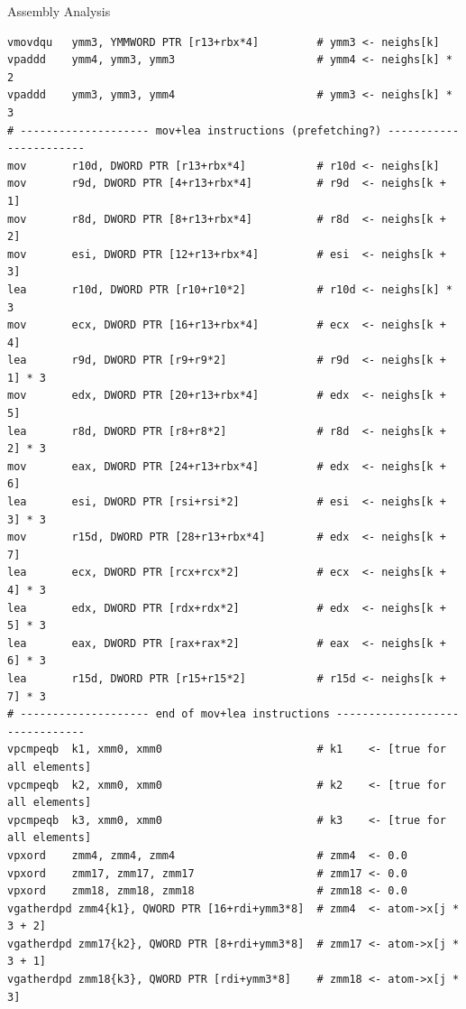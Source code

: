 \documentclass[aspectratio=169,t]{beamer}
\begin{document}
  \begin{frame}[fragile]{Assembly Analysis}
    \vspace{-17.5pt}
    \begin{lstlisting}[language={[x64]Assembler},basicstyle=\tt\tiny]
vmovdqu   ymm3, YMMWORD PTR [r13+rbx*4]         # ymm3 <- neighs[k]
vpaddd    ymm4, ymm3, ymm3                      # ymm4 <- neighs[k] * 2
vpaddd    ymm3, ymm3, ymm4                      # ymm3 <- neighs[k] * 3
# -------------------- mov+lea instructions (prefetching?) -----------------------
mov       r10d, DWORD PTR [r13+rbx*4]           # r10d <- neighs[k]
mov       r9d, DWORD PTR [4+r13+rbx*4]          # r9d  <- neighs[k + 1]
mov       r8d, DWORD PTR [8+r13+rbx*4]          # r8d  <- neighs[k + 2]
mov       esi, DWORD PTR [12+r13+rbx*4]         # esi  <- neighs[k + 3]
lea       r10d, DWORD PTR [r10+r10*2]           # r10d <- neighs[k] * 3
mov       ecx, DWORD PTR [16+r13+rbx*4]         # ecx  <- neighs[k + 4]
lea       r9d, DWORD PTR [r9+r9*2]              # r9d  <- neighs[k + 1] * 3
mov       edx, DWORD PTR [20+r13+rbx*4]         # edx  <- neighs[k + 5]
lea       r8d, DWORD PTR [r8+r8*2]              # r8d  <- neighs[k + 2] * 3
mov       eax, DWORD PTR [24+r13+rbx*4]         # edx  <- neighs[k + 6]
lea       esi, DWORD PTR [rsi+rsi*2]            # esi  <- neighs[k + 3] * 3
mov       r15d, DWORD PTR [28+r13+rbx*4]        # edx  <- neighs[k + 7]
lea       ecx, DWORD PTR [rcx+rcx*2]            # ecx  <- neighs[k + 4] * 3
lea       edx, DWORD PTR [rdx+rdx*2]            # edx  <- neighs[k + 5] * 3
lea       eax, DWORD PTR [rax+rax*2]            # eax  <- neighs[k + 6] * 3
lea       r15d, DWORD PTR [r15+r15*2]           # r15d <- neighs[k + 7] * 3
# -------------------- end of mov+lea instructions -------------------------------
vpcmpeqb  k1, xmm0, xmm0                        # k1    <- [true for all elements]
vpcmpeqb  k2, xmm0, xmm0                        # k2    <- [true for all elements]
vpcmpeqb  k3, xmm0, xmm0                        # k3    <- [true for all elements]
vpxord    zmm4, zmm4, zmm4                      # zmm4  <- 0.0
vpxord    zmm17, zmm17, zmm17                   # zmm17 <- 0.0
vpxord    zmm18, zmm18, zmm18                   # zmm18 <- 0.0
vgatherdpd zmm4{k1}, QWORD PTR [16+rdi+ymm3*8]  # zmm4  <- atom->x[j * 3 + 2]
vgatherdpd zmm17{k2}, QWORD PTR [8+rdi+ymm3*8]  # zmm17 <- atom->x[j * 3 + 1]
vgatherdpd zmm18{k3}, QWORD PTR [rdi+ymm3*8]    # zmm18 <- atom->x[j * 3]
    \end{lstlisting}
  \end{frame}
\end{document}
